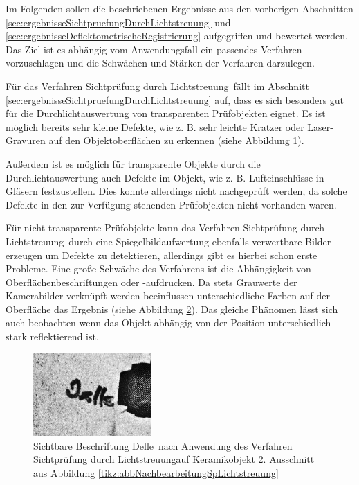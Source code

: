 Im Folgenden sollen die beschriebenen Ergebnisse aus den vorherigen Abschnitten \ref{sec:ergebnisseSichtpruefungDurchLichtstreuung} und \ref{sec:ergebnisseDeflektometrischeRegistrierung} aufgegriffen und bewertet werden.
Das Ziel ist es abhängig vom Anwendungsfall ein passendes Verfahren vorzuschlagen und die Schwächen und Stärken der Verfahren darzulegen.

\p
Für das Verfahren \glqq Sichtprüfung durch Lichtstreuung\grqq ~fällt im Abschnitt \ref{sec:ergebnisseSichtpruefungDurchLichtstreuung} auf, dass es sich besonders gut für die Durchlichtauswertung von transparenten Prüfobjekten eignet.
Es ist möglich bereits sehr kleine Defekte, wie z. B. sehr leichte Kratzer oder Laser-Gravuren auf den Objektoberflächen zu erkennen (siehe Abbildung \ref{tikz:abbErkennbareKleineDefekteLichtstreuung}).

{
	\begin{figure}[H]
		\centering
		
		\label{tikz:abbErkennbareKleineDefekteLichtstreuung}
	\end{figure}
}

\noindent
Außerdem ist es möglich für transparente Objekte durch die Durchlichtauswertung auch Defekte im Objekt, wie z. B. Lufteinschlüsse in Gläsern festzustellen.
Dies konnte allerdings nicht nachgeprüft werden, da solche Defekte in den zur Verfügung stehenden Prüfobjekten nicht vorhanden waren.

\p
Für nicht-transparente Prüfobjekte kann das Verfahren \glqq Sichtprüfung durch Lichtstreuung\grqq ~durch eine Spiegelbildaufwertung ebenfalls verwertbare Bilder erzeugen um Defekte zu detektieren, allerdings gibt es hierbei schon erste Probleme.
Eine große Schwäche des Verfahrens ist die Abhängigkeit von Oberflächenbeschriftungen oder -aufdrucken.
Da stets Grauwerte der Kamerabilder verknüpft werden beeinflussen unterschiedliche Farben auf der Oberfläche das Ergebnis (siehe Abbildung \ref{img:delleBeschriftung}).
Das gleiche Phänomen lässt sich auch beobachten wenn das Objekt abhängig von der Position unterschiedlich stark reflektierend ist.

{
	\begin{figure}[H]
		\centering
		\includegraphics[width=0.4\textwidth]{05_ergebnisse/ergDiskussion/figures/delleBeschriftung}
		\caption[Sichtbare Beschriftung nach Anwendung des Verfahrens aus Kapitel \ref{chp:sichtpruefungDurchLichtstreuung}]{Sichtbare Beschriftung \glqq Delle\grqq ~nach Anwendung des Verfahren \glqq Sichtprüfung durch Lichtstreuung\grqq auf Keramikobjekt 2. Ausschnitt aus Abbildung \ref{tikz:abbNachbearbeitungSpLichtstreuung}}
		\label{img:delleBeschriftung}
	\end{figure}
}

